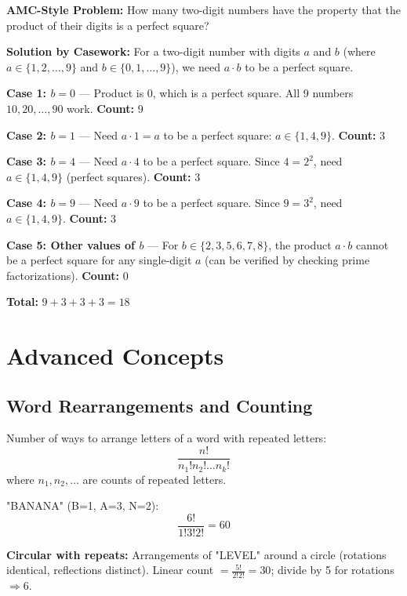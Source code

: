 \documentclass[12pt]{extarticle}
\begin{document}
\begin{examplebox}
\large \textbf{AMC-Style Problem:} How many two-digit numbers have the property that the product of their digits is a perfect square?
\vspace{0.5cm}

\textbf{Solution by Casework:} For a two-digit number with digits $a$ and $b$ (where $a \in \{1,2,\ldots,9\}$ and $b \in \{0,1,\ldots,9\}$), we need $a \cdot b$ to be a perfect square.

\textbf{Case 1: $b = 0$} — Product is 0, which is a perfect square. All 9 numbers $10, 20, \ldots, 90$ work. \textbf{Count:} 9

\textbf{Case 2: $b = 1$} — Need $a \cdot 1 = a$ to be a perfect square: $a \in \{1, 4, 9\}$. \textbf{Count:} 3

\textbf{Case 3: $b = 4$} — Need $a \cdot 4$ to be a perfect square. Since $4 = 2^2$, need $a \in \{1, 4, 9\}$ (perfect squares). \textbf{Count:} 3

\textbf{Case 4: $b = 9$} — Need $a \cdot 9$ to be a perfect square. Since $9 = 3^2$, need $a \in \{1, 4, 9\}$. \textbf{Count:} 3

\textbf{Case 5: Other values of $b$} — For $b \in \{2, 3, 5, 6, 7, 8\}$, the product $a \cdot b$ cannot be a perfect square for any single-digit $a$ (can be verified by checking prime factorizations). \textbf{Count:} 0

\textbf{Total:} $9 + 3 + 3 + 3 = 18$
\end{examplebox}

\newpage
\section{Advanced Concepts}

\subsection{Word Rearrangements and Counting}
Number of ways to arrange letters of a word with repeated letters:
\[
\frac{n!}{n_1! n_2! \dots n_k!}
\]
where $n_1, n_2, \dots$ are counts of repeated letters.

\begin{examplebox}
"BANANA" (B=1, A=3, N=2):
\[
\frac{6!}{1!3!2!} = 60
\]
\end{examplebox}

\begin{examplebox}
\textbf{Circular with repeats:} Arrangements of "LEVEL" around a circle (rotations identical, reflections distinct). Linear count $=\frac{5!}{2!2!}=30$; divide by 5 for rotations $\Rightarrow 6$.
\end{examplebox}
\end{document}
